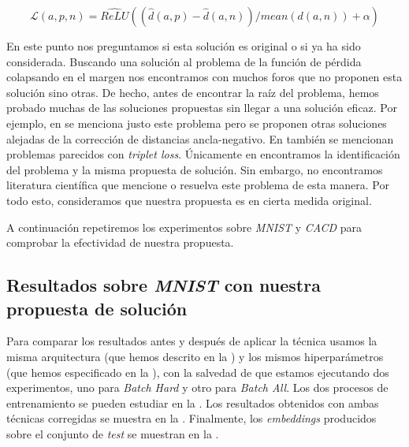 \begin{equation}
    \mathcal{L}(a, p, n) = \hat{ReLU}((\hat{d}(a, p) - \hat{d}(a, n)) / mean(d(a, n)) + \alpha)
\end{equation}


En este punto nos preguntamos si esta solución es original o si ya ha sido considerada. Buscando una solución al problema de la función de pérdida colapsando en el margen nos encontramos con muchos foros que no proponen esta solución sino otras. De hecho, antes de encontrar la raíz del problema, hemos probado muchas de las soluciones propuestas sin llegar a una solución eficaz. Por ejemplo, en \cite{informatica:respuesta_erronea_problema} se menciona justo este problema pero se proponen otras soluciones alejadas de la corrección de distancias ancla-negativo. En \cite{informatica:github_issue_problema_tripletloss} también se mencionan problemas parecidos con \textit{triplet loss}. Únicamente en \cite{informatica:solucion_triplet_loss} encontramos la identificación del problema y la misma propuesta de solución. Sin embargo, no encontramos literatura científica que mencione o resuelva este problema de esta manera. Por todo esto, consideramos que nuestra propuesta es en cierta medida original.

A continuación repetiremos los experimentos sobre \textit{MNIST} y \textit{CACD} para comprobar la efectividad de nuestra propuesta.

\subsection{Resultados sobre \textit{MNIST} con nuestra propuesta de solución} \label{isubsec:experimentacion_mnist_bien}

Para comparar los resultados antes y después de aplicar la técnica usamos la misma arquitectura (que hemos descrito en la ) y los mismos hiperparámetros (que hemos especificado en la ), con la salvedad de que estamos ejecutando dos experimentos, uno para \textit{Batch Hard} y otro para \textit{Batch All}. Los dos procesos de entrenamiento se pueden estudiar en la . Los resultados obtenidos con ambas técnicas corregidas se muestra en la . Finalmente, los \textit{embeddings} producidos sobre el conjunto de \textit{test} se muestran en la .

